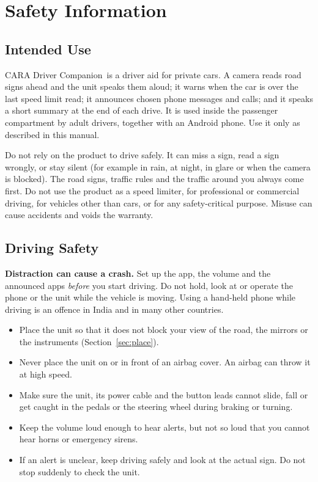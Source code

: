 \documentclass[11pt,a4paper,oneside]{report}
\newcommand{\ProductName}{CARA Driver Companion}
\begin{document}
\chapter{Safety Information}\label{ch:safety}

\section{Intended Use}
\ProductName\ is a driver aid for private cars. A camera reads road signs ahead and the unit speaks them aloud; it warns when the car is over the last speed limit read; it announces chosen phone messages and calls; and it speaks a short summary at the end of each drive. It is used inside the passenger compartment by adult drivers, together with an Android phone. Use it only as described in this manual.

\begin{warning}
Do not rely on the product to drive safely. It can miss a sign, read a sign wrongly, or stay silent (for example in rain, at night, in glare or when the camera is blocked). The road signs, traffic rules and the traffic around you always come first. Do not use the product as a speed limiter, for professional or commercial driving, for vehicles other than cars, or for any safety-critical purpose. Misuse can cause accidents and voids the warranty.
\end{warning}

\section{Driving Safety}
\begin{warning}
\textbf{Distraction can cause a crash.} Set up the app, the volume and the announced apps \emph{before} you start driving. Do not hold, look at or operate the phone or the unit while the vehicle is moving. Using a hand-held phone while driving is an offence in India and in many other countries.
\end{warning}
\begin{itemize}[leftmargin=*]
\item Place the unit so that it does not block your view of the road, the mirrors or the instruments (Section~\ref{sec:place}).
\item Never place the unit on or in front of an airbag cover. An airbag can throw it at high speed.
\item Make sure the unit, its power cable and the button leads cannot slide, fall or get caught in the pedals or the steering wheel during braking or turning.
\item Keep the volume loud enough to hear alerts, but not so loud that you cannot hear horns or emergency sirens.
\item If an alert is unclear, keep driving safely and look at the actual sign. Do not stop suddenly to check the unit.
\end{itemize}
\end{document}
